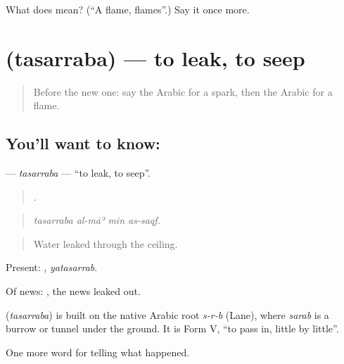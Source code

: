 \begin{tcolorbox}[breakable,colback=teal!4,colframe=teal!35!black,title={Before you move on}]
What does  mean? (\textquotedblleft{}A flame, flames\textquotedblright{}.) Say it once more.
\end{tcolorbox}
\section[\texorpdfstring{\ar{تسرب} (tasarraba)}{تسرب (tasarraba)}]{ (tasarraba) — to leak, to seep}

\label{lesson:AR-C354-tasarraba}



\begin{quote}
Before the new one: say the Arabic for a spark, then the Arabic for a flame.
\end{quote}

\subsection*{You'll want to know: }
\textbf{} — \emph{tasarraba} — \textquotedblleft{}to leak, to seep\textquotedblright{}.

\begin{quote}
   .
\end{quote}

\begin{quote}
\emph{tasarraba al-māʾ min as-saqf.}
\end{quote}

\begin{quote}
Water leaked through the ceiling.
\end{quote}

Present: , \emph{yatasarrab}.

Of news:  , the news leaked out.

\begin{cousinweb}
\textbf{} (\emph{tasarraba}) is built on the native Arabic root \emph{s-r-b} (Lane), where \emph{sarab} is a burrow or tunnel under the ground. It is Form V, \textquotedblleft{}to pass in, little by little\textquotedblright{}.
\end{cousinweb}

\begin{grammarlens}[title={What you've built}]
One more word for telling what happened.
\end{grammarlens}

